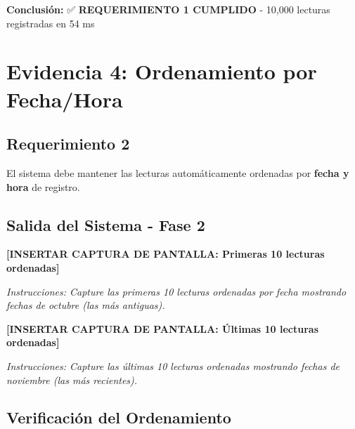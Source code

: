 \documentclass[12pt,a4paper]{article}
\begin{document}
\textbf{Conclusión:} ✅ \textbf{REQUERIMIENTO 1 CUMPLIDO} - 10,000 lecturas registradas en 54 ms


\section{Evidencia 4: Ordenamiento por Fecha/Hora}

\subsection{Requerimiento 2}

\begin{tcolorbox}[colback=yellow!10,colframe=orange,title=\textbf{RF-002: Ordenamiento Automático}]
El sistema debe mantener las lecturas automáticamente ordenadas por \textbf{fecha y hora} de registro.
\end{tcolorbox}

\subsection{Salida del Sistema - Fase 2}

\begin{tcolorbox}[colback=green!5,colframe=green!75!black,title=\textbf{FASE 2: ORDENAMIENTO POR FECHA/HORA}]
\vspace{0.5cm}
\textbf{[INSERTAR CAPTURA DE PANTALLA: Primeras 10 lecturas ordenadas]}

\textit{Instrucciones: Capture las primeras 10 lecturas ordenadas por fecha mostrando fechas de octubre (las más antiguas).}
\vspace{1cm}

\textbf{[INSERTAR CAPTURA DE PANTALLA: Últimas 10 lecturas ordenadas]}

\textit{Instrucciones: Capture las últimas 10 lecturas ordenadas mostrando fechas de noviembre (las más recientes).}
\vspace{0.5cm}
\end{tcolorbox}

\subsection{Verificación del Ordenamiento}
\end{document}
